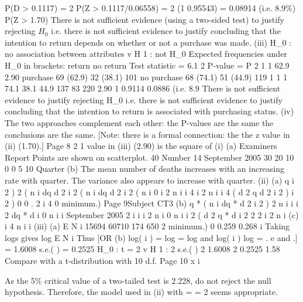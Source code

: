 \documentclass[a4paper,12pt]{article}
\begin{document}
P(D > 0.1117) = 2 P(Z > 0.1117/0.06558) = 2
(1 0.95543) = 0.08914 (i.e. 8.9\%)
P(Z > 1.70)
There is not sufficient evidence (using a two-sided test) to justify rejecting $H_0$ i.e. there is not sufficient evidence to justify concluding that the intention to return depends on whether or not a purchase was made.
(iii)
H_0 : no association between attributes v H 1 : not H_0
Expected frequencies under H_0 in brackets:
return
no return
Test statistic = 6.1 2
P-value = P
2
1
1
62.9
2.90
purchase
69 (62.9)
32 (38.1)
101
no purchase
68 (74.1)
51 (44.9)
119
1
1
1
74.1 38.1 44.9
137
83
220
2.90
1 0.9114 0.0886 (i.e. 8.9%
There is not sufficient evidence to justify rejecting H_0 i.e. there is not sufficient evidence to justify concluding that the intention to return is associated with purchasing status.
(iv)
The two approaches complement each other:
the P-values are the same
the conclusions are the same.
[Note: there is a formal connection: the the z value in (ii) (1.70).]
Page 8
2
1 value
in (iii) (2.90) is the square of
(i)
(a)
Examiners Report
Points are shown on scatterplot.
40
Number
14
September 2005
30
20
10
0
0
5
10
Quarter
(b)
The mean number of deaths increases with an increasing rate with quarter.
The variance also appears to increase with quarter.
(ii)
(a)
q
i 2 ) 2
( n i
dq
d
2 i 2 ( n i
dq
d
2 i 2 ( n i
0
i 2 n i
i 4
i 2 n i
i 4
(
d 2 q
d
2
i 2 )
i 2 ) 0
0
.
2 i 4
0
minimum.)
Page 9Subject CT3 
(b)
q * ( n i
dq *
d 2
i 2 ) 2
n i
i
i 2
dq *
d
i
0
n i
i
September 2005
2
i
i
i 2
n i
0
n i
i 2
(
d 2 q *
d
i 2
2
2
i 2 n i
(c)
i
4
n i
i
(iii)
(a)
E N i
15694
60710
174
650
2
minimum.)
0
0.259
0.268
i
Taking logs gives
log E N i
Thus
[OR
(b)
log( i ) = log
= log and
log( i ) log
= .
e and
.]
= 1.6008 s.e.( ) = 0.2525
H_0 :
t
= 2 v H 1 :
2
s.e.( )
2
1.6008 2
0.2525
1.58
Compare with a t-distribution with 10 d.f.
Page 10
x i

As the 5\% critical value of a two-tailed test is 2.228, do not reject the null hypothesis.
Therefore, the model used in (ii) with
=
= 2 seems appropriate.
\end{document}
